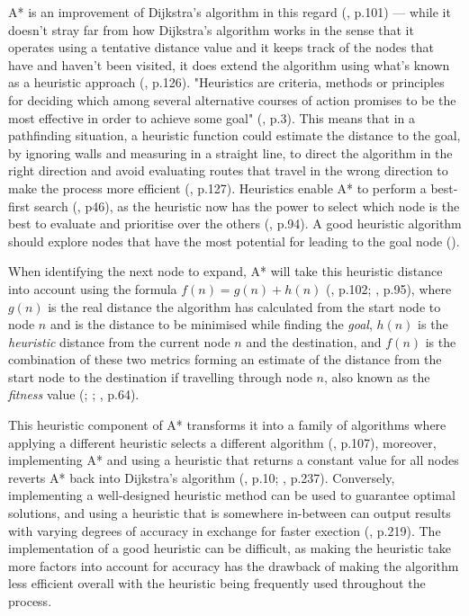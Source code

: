 \documentclass[11pt, a4paper]{article}
\begin{document}
A* is an improvement of Dijkstra's algorithm in this regard (\cite{hart1968formal}, p.101) --- while it doesn't stray far from how Dijkstra's algorithm works in the sense that it operates using a tentative distance value and it keeps track of the nodes that have and haven't been visited, it does extend the algorithm using what's known as a heuristic approach (\cite{cui2011based}, p.126). "Heuristics are criteria, methods or principles for deciding which among several alternative courses of action promises to be the most effective in order to achieve some goal" (\cite{pearl1984heuristics}, p.3). This means that in a pathfinding situation, a heuristic function could estimate the distance to the goal, by ignoring walls and measuring in a straight line, to direct the algorithm in the right direction and avoid evaluating routes that travel in the wrong direction to make the process more efficient (\cite{cui2011based}, p.127). Heuristics enable A* to perform a best-first search (\cite{yap2002grid}, p46), as the heuristic now has the power to select which node is the best to evaluate and prioritise over the others (\cite{russell2016artificial}, p.94). A good heuristic algorithm should explore nodes that have the most potential for leading to the goal node (\cite{korf1985depth}).

When identifying the next node to expand, A* will take this heuristic distance into account using the formula $f(n) = g(n) + h(n)$ (\cite{hart1968formal}, p.102; \cite{russell2016artificial}, p.95), where $g(n)$ is the real distance the algorithm has calculated from the start node to node $n$ and is the distance to be minimised while finding the \emph{goal}, $h(n)$ is the \emph{heuristic} distance from the current node $n$ and the destination, and $f(n)$ is the combination of these two metrics forming an estimate of the distance from the start node to the destination if travelling through node $n$, also known as the \emph{fitness} value (\cite{hart1968formal}; \cite{millington2019ai}; \cite{graham2003pathfinding}, p.64). 

This heuristic component of A* transforms it into a family of algorithms where applying a different heuristic selects a different algorithm (\cite{hart1968formal}, p.107), moreover, implementing A* and using a heuristic that returns a constant value for all nodes reverts A* back into Dijkstra's algorithm (\cite{lester2005pathfinding}, p.10; \cite{millington2019ai}, p.237). Conversely, implementing a well-designed heuristic method can be used to guarantee optimal solutions, and using a heuristic that is somewhere in-between can output results with varying degrees of accuracy in exchange for faster exection (\cite{millington2019ai}, p.219).  The implementation of a good heuristic can be difficult, as making the heuristic take more factors into account for accuracy has the drawback of making the algorithm less efficient overall with the heuristic being frequently used throughout the process.
\end{document}
